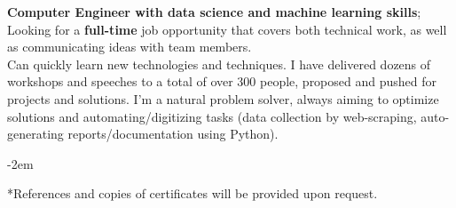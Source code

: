 \documentclass[10pt,a4paper,ragged2e]{altacv}
\begin{document}



\begin{fullwidth}
  \makecvheader

  \textbf{Computer Engineer with data science and machine learning skills}; Looking for a \textbf{full-time} job opportunity that covers both technical work, as well as communicating ideas with team members.\\

  Can quickly learn new technologies and techniques.
  I have delivered dozens of workshops and speeches to a total of over 300 people, proposed and pushed for projects and solutions.
  \smallskip
  I'm a natural problem solver, always aiming to optimize solutions and automating/digitizing tasks (data collection by web-scraping, auto-generating reports/documentation using Python).

\end{fullwidth}



{}
\kern-2em %








% 

% 


\mbox{}
\vfill

*References and copies of certificates will be provided upon request.
\end{document}
